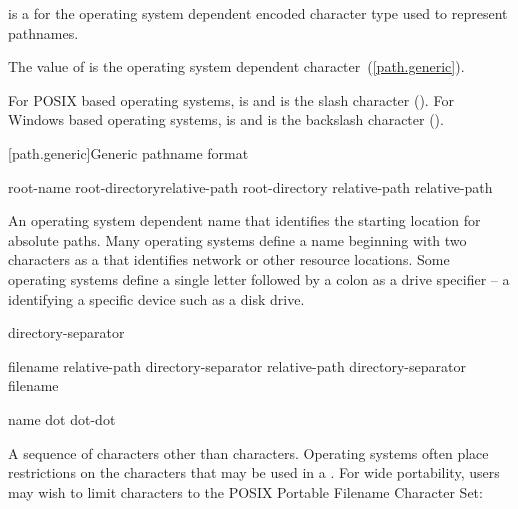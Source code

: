 \pnum
{} is a  for the
operating system dependent encoded character type used to represent pathnames.

\pnum
The value of 
is the operating system dependent  character~(\ref{path.generic}).

\pnum
\enterexample
For POSIX based operating systems,
 is  and
 is the slash character ().
For Windows based operating systems,
 is  and
 is the backslash character ().
\exitexample

[path.generic]{Generic pathname format}

\begin{ncbnf}
\br
    root-name root-directory\opt relative-path\opt\br
    root-directory relative-path\opt\br
    relative-path
\end{ncbnf}

\begin{ncbnf}
\br
    \textnormal{An operating system dependent name that identifies the starting location for absolute paths.
\enternote Many operating systems define a name
beginning with two  characters
as a  that identifies
network or other resource locations.
Some operating systems
define a single letter followed by a colon
as a drive specifier -- a 
identifying a specific device such as a disk drive.
\exitnote
}
\end{ncbnf}

\begin{ncbnf}
\br
    directory-separator
\end{ncbnf}

\begin{ncbnf}
\br
    filename\br
    relative-path directory-separator\br
    relative-path directory-separator filename
\end{ncbnf}

\begin{ncbnf}
\br
    name\br
    dot\br
    dot-dot
\end{ncbnf}

\begin{ncbnf}
\br
    \textnormal{A sequence of characters other than  characters.
\enternote
Operating systems often place restrictions
on the characters that may be used in a .
For wide portability, users may wish to limit 
characters to the POSIX Portable Filename Character Set: \\
 \\
 \\
\exitnote
}
\end{ncbnf}

